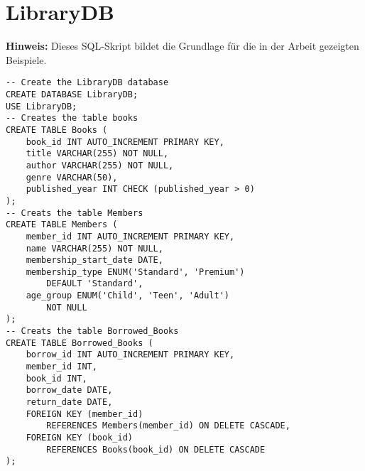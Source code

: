 \chapter*{LibraryDB}
\label{sec:library_db} \textbf{Hinweis:} Dieses SQL-Skript bildet die Grundlage
für die in der Arbeit gezeigten Beispiele.

\begin{lstlisting}[caption={SQL Skript LibraryDB}, label={list:skript_library_db}]
-- Create the LibraryDB database
CREATE DATABASE LibraryDB;
USE LibraryDB;
-- Creates the table books
CREATE TABLE Books (
    book_id INT AUTO_INCREMENT PRIMARY KEY,
    title VARCHAR(255) NOT NULL,
    author VARCHAR(255) NOT NULL,
    genre VARCHAR(50),
    published_year INT CHECK (published_year > 0)
);
-- Creats the table Members
CREATE TABLE Members (
    member_id INT AUTO_INCREMENT PRIMARY KEY,
    name VARCHAR(255) NOT NULL,
    membership_start_date DATE,
    membership_type ENUM('Standard', 'Premium')
        DEFAULT 'Standard',
    age_group ENUM('Child', 'Teen', 'Adult')
        NOT NULL
);
-- Creats the table Borrowed_Books
CREATE TABLE Borrowed_Books (
    borrow_id INT AUTO_INCREMENT PRIMARY KEY,
    member_id INT,
    book_id INT,
    borrow_date DATE,
    return_date DATE,
    FOREIGN KEY (member_id)
        REFERENCES Members(member_id) ON DELETE CASCADE,
    FOREIGN KEY (book_id)
        REFERENCES Books(book_id) ON DELETE CASCADE
);
\end{lstlisting}
